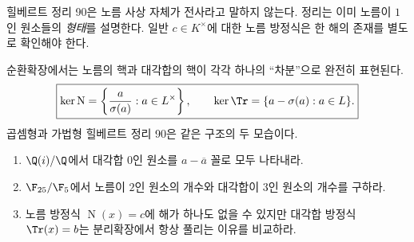 \begin{pitfall}
힐베르트 정리 90은 노름 사상 자체가 전사라고 말하지 않는다. 정리는 이미 노름이 $1$인 원소들의 \emph{형태}를 설명한다. 일반 $c\in K^\times$에 대한 노름 방정식은 한 해의 존재를 별도로 확인해야 한다.
\end{pitfall}

\begin{keyidea}
순환확장에서는 노름의 핵과 대각합의 핵이 각각 하나의 ``차분''으로 완전히 표현된다.
\[
  \boxed{
  \ker\operatorname N
  =\left\{\frac{a}{\sigma(a)}:a\in L^\times\right\},
  \qquad
  \ker\Tr
  =\{a-\sigma(a):a\in L\}.}
\]
곱셈형과 가법형 힐베르트 정리 90은 같은 구조의 두 모습이다.
\end{keyidea}

\begin{checkpoint}
\begin{enumerate}[label=(\alph*)]
  \item $\Q(i)/\Q$에서 대각합 $0$인 원소를 $a-\overline a$ 꼴로 모두 나타내라.
  \item $\F_{25}/\F_5$에서 노름이 $2$인 원소의 개수와 대각합이 $3$인 원소의 개수를 구하라.
  \item 노름 방정식 $\operatorname N(x)=c$에 해가 하나도 없을 수 있지만 대각합 방정식 $\Tr(x)=b$는 분리확장에서 항상 풀리는 이유를 비교하라.
\end{enumerate}
\end{checkpoint}
